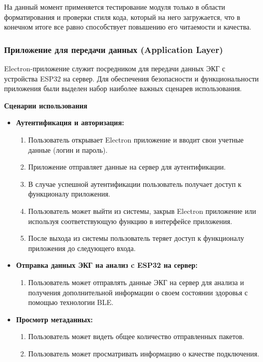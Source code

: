 \documentclass[12pt, russian]{extarticle}
\begin{document}
\begin{spacing}{1.5}
На данный момент применяется тестирование модуля только в области форматирования и проверки стиля кода, который на него загружается, что в конечном итоге все равно способствует повышению его читаемости и качества.

\subsubsection{Приложение для передачи данных (Application Layer)}

Electron-приложение служит посредником для передачи данных ЭКГ с устройства ESP32 на сервер. Для обеспечения безопасности и функциональности приложения были выделен набор наиболее важных сценарев использования.

\par \noindent \textbf{Сценарии использования}

\begin{itemize}
    \item \textbf{Аутентификация и авторизация:} \\
        \begin{enumerate}
            \item Пользователь открывает Electron приложение и вводит свои учетные данные (логин и пароль).
            \item Приложение отправляет данные на сервер для аутентификации.
            \item В случае успешной аутентификации пользователь получает доступ к функционалу приложения.
            \item Пользователь может выйти из системы, закрыв Electron приложение или используя соответствующую функцию в интерфейсе приложения.
            \item После выхода из системы пользователь теряет доступ к функционалу приложения до следующего входа.
        \end{enumerate}
    \item \textbf{Отправка данных ЭКГ на анализ c ESP32 на сервер:} \\
        \begin{enumerate}
            \item Пользователь может отправлять данные ЭКГ на сервер для анализа и получения дополнительной информации о своем состоянии здоровья с помощью технологии BLE.
        \end{enumerate}
    \item \textbf{Просмотр метаданных:} \\
        \begin{enumerate}
            \item Пользователь может видеть общее количество отправленных пакетов.
            \item Пользователь может просматривать информацию о качестве подключения.
        \end{enumerate}
\end{itemize}


\end{spacing}
\end{document}
